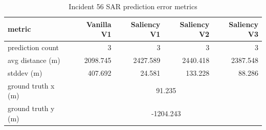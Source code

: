 \begin{table}[ht]
\centering
\caption{Incident 56 SAR prediction error metrics}
\label{tab:sar-incident-56}
\begin{tabular}{lrrrr}
\hline
metric & Vanilla V1 & Saliency V1 & Saliency V2 & Saliency V3 \\
\hline
prediction count & 3 & 3 & 3 & 3 \\
avg distance (m) & 2098.745 & 2427.589 & 2440.418 & 2387.548 \\
stddev (m) & 407.692 & 24.581 & 133.228 & 88.286 \\
ground truth x (m) & \multicolumn{4}{c}{91.235} \\
ground truth y (m) & \multicolumn{4}{c}{-1204.243} \\
\hline
\end{tabular}
\end{table}
